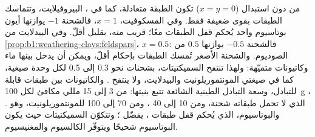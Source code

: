 من دون استبدال ($x = y = 0$) تكون الطبقة متعادلة، كما في ،  البيروفيلايت، وتتماسك الطبقات بقوى ضعيفة فقط. وفي المسكوفيت، $x = 1$، فالشحنة $-1$ يوازنها أيون بوتاسيوم واحد يُحكم قفل الطبقات معًا؛  قريب منه، بقليل أقلّ. وفي البيدلايت من \cref{prop:b1:weathering-clays:feldspars}، $x = 0.5$: فالشحنة $-0.5$ يوازنها $0.5$ من الصوديوم. والشحنة الأصغر تُمسك الطبقات بإحكام أقلّ، ويمكن أن يدخل بينها ماء وكاتيونات متميّهة: ولهذا تنتفخ السميكتيتات، بشحنات نحو 0.3 إلى 0.5 لكل وحدة صيغية، كما في صيغتي المونتموريلونيت والبيدلايت، ولا ينتفخ . والكاتيونات بين طبقات  قابلة للتبادل، وسعة التبادل  الطينية الشائعة تتبع بنيتها: من 3 إلى 15 مللي مكافئ لكل \qty{100}{g} ، الذي لا تحمل طبقاته شحنة، ومن 10 إلى 40 ، ومن 70 إلى 100 للمونتموريلونيت، وهو . والبوتاسيوم، الذي يُحكم قفل طبقات ، يفضّل ؛ وتتكوّن السميكتيتات حيث يكون البوتاسيوم شحيحًا ويتوفّر الكالسيوم والمغنيسيوم.

